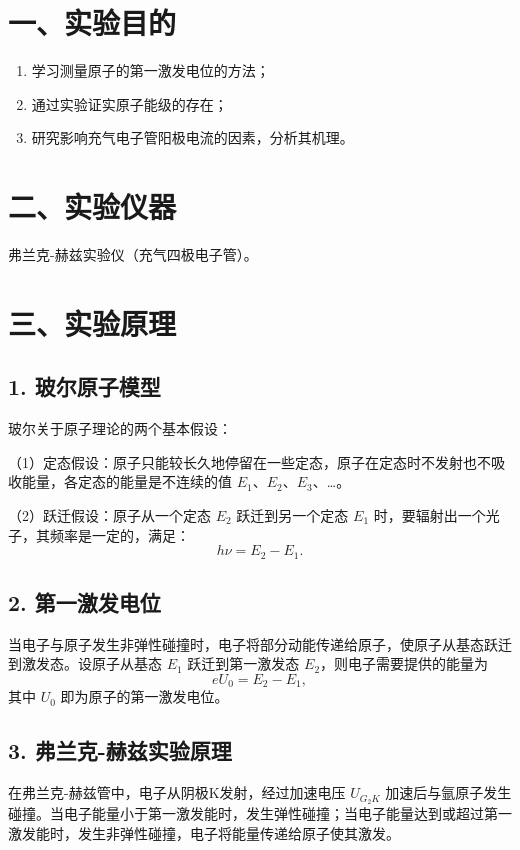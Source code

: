 \documentclass[UTF8,a4paper,zihao=-4]{ctexart}
\begin{document}
\section*{一、实验目的}

\begin{enumerate}[label=\arabic*.]
    \item 学习测量原子的第一激发电位的方法；
    \item 通过实验证实原子能级的存在；
    \item 研究影响充气电子管阳极电流的因素，分析其机理。
\end{enumerate}

\section*{二、实验仪器}

弗兰克-赫兹实验仪（充气四极电子管）。

\section*{三、实验原理}

\subsection*{1. 玻尔原子模型}

玻尔关于原子理论的两个基本假设：

（1）定态假设：原子只能较长久地停留在一些定态，原子在定态时不发射也不吸收能量，各定态的能量是不连续的值 \(E_1\)、\(E_2\)、\(E_3\)、…。

（2）跃迁假设：原子从一个定态 \(E_2\) 跃迁到另一个定态 \(E_1\) 时，要辐射出一个光子，其频率是一定的，满足：
\[
h\nu = E_2 - E_1.
\]

\subsection*{2. 第一激发电位}

当电子与原子发生非弹性碰撞时，电子将部分动能传递给原子，使原子从基态跃迁到激发态。设原子从基态 \(E_1\) 跃迁到第一激发态 \(E_2\)，则电子需要提供的能量为
\[
eU_0 = E_2 - E_1,
\]
其中 \(U_0\) 即为原子的第一激发电位。

\subsection*{3. 弗兰克-赫兹实验原理}

在弗兰克-赫兹管中，电子从阴极K发射，经过加速电压 \(U_{G_2K}\) 加速后与氩原子发生碰撞。当电子能量小于第一激发能时，发生弹性碰撞；当电子能量达到或超过第一激发能时，发生非弹性碰撞，电子将能量传递给原子使其激发。
\end{document}
